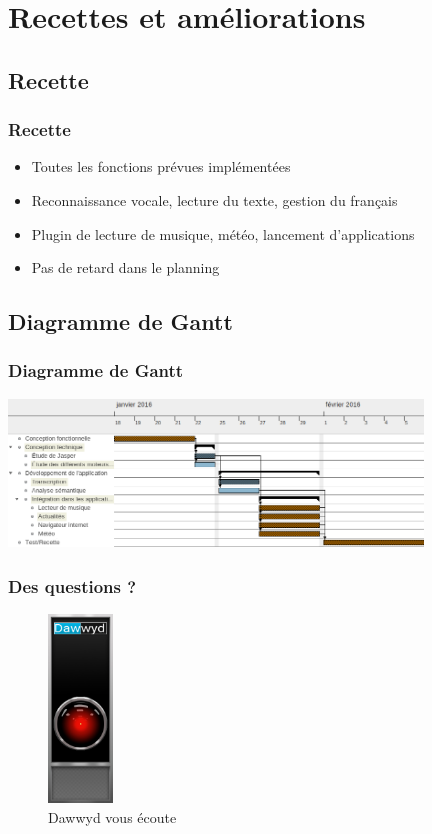 \documentclass{beamer}
\begin{document}
\section{Recettes et améliorations}

\subsection{Recette}
\begin{frame}
\frametitle{Recette}
\begin{itemize}
    \setlength\itemsep{2em}
    \item Toutes les fonctions prévues implémentées
    \item Reconnaissance vocale, lecture du texte, gestion du français
    \item Plugin de lecture de musique, météo, lancement d'applications
    \item Pas de retard dans le planning
\end{itemize}
\end{frame}


\subsection{Diagramme de Gantt}

\begin{frame}
\frametitle{Diagramme de Gantt}
	\includegraphics[width=11cm]{gantt}
\end{frame}

\begin{frame}
\frametitle{Des questions ?}
\centering
\begin{figure}
    \includegraphics[height=5cm]{hal_dawwyd}
    \caption{Dawwyd vous écoute}
\end{figure}
\end{frame}
\end{document}
